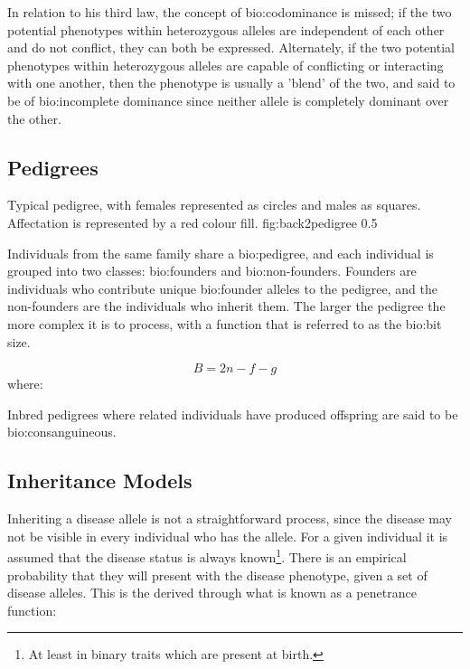 In relation to his third law, the concept of \gls{bio:codominance} is missed; if the two potential phenotypes within heterozygous alleles are independent of each other and do not conflict, they can both be expressed. Alternately, if the two potential phenotypes within heterozygous alleles are capable of conflicting or interacting with one another, then the phenotype is usually a 'blend' of the two, and said to be of \gls{bio:incomplete dominance} since neither allele is completely dominant over the other.


\subsection{Pedigrees}

	{Typical pedigree, with females represented as circles and males as squares. Affectation is represented by a red colour fill.}
	{fig:back2pedigree}
	{0.5}

Individuals from the same family share a \gls{bio:pedigree}, and each individual is grouped into two classes: \gls{bio:founders} and \gls{bio:non-founders}. 
Founders are individuals who contribute unique \gls{bio:founder alleles} to the pedigree, and the non-founders are the individuals who inherit them.
The larger the pedigree the more complex it is to process, with a function that is referred to as the \gls{bio:bit size}.

\begin{equation}
\label{bitsize}
B = 2n -f -g
\end{equation}
where:

\begin{description}
\end{description}

Inbred pedigrees where related individuals have produced offspring are said to be \gls{bio:consanguineous}.


\subsection{Inheritance Models}

Inheriting a disease allele is not a straightforward process, since the disease may not be visible in every individual who has the allele. For a given individual it is assumed that the disease status is always known\footnote{At least in binary traits which are present at birth.}.  There is an empirical probability that they will present with the disease phenotype, given a set of disease alleles. This is the derived through what is known as a penetrance function:

